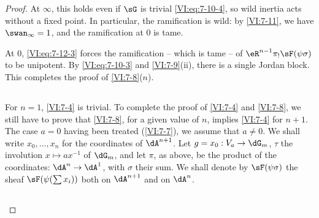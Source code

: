 \begin{proof}[Proof]
At $\infty$, this holds even if $\sG$ is trivial \eqref{VI:eq:7-10-4}, 
so wild inertia acts without a fixed point. In particular, the 
ramification is wild: by \ref{VI:7-11}, we have $\swan_\infty=1$, and the 
ramification at $0$ is tame. 

At $0$, \eqref{VI:eq:7-12-3} forces the ramification -- which is tame -- of 
$\eR^{n-1} \pi_! \sF(\psi\sigma)$ to be unipotent. By 
\eqref{VI:eq:7-10-3} and \ref{VI:7-9}(ii), there is a single Jordan block. This 
completes the proof of \ref{VI:7-8}($n$). 





\subsection{}\label{VI:7-13}

For $n=1$, \ref{VI:7-4} is trivial. To complete the proof of \ref{VI:7-4} and 
\ref{VI:7-8}, we still have to prove that \ref{VI:7-8}, for a given value 
of $n$, implies \ref{VI:7-4} for $n+1$. The case $a=0$ having been 
  treated (\ref{VI:7-7}), we assume that $a\ne 0$. We shall write $x_0,\dots,x_n$ for 
the coordinates of $\dA^{n+1}$. Let $g=x_0:V_a\to \dG_m$, $\tau$ 
the involution $x\mapsto a x^{-1}$ of $\dG_m$, and let $\pi$, as above, be the 
product of the coordinates: $\dA^n \to \dA^1$, with $\sigma$ their sum. We 
shall denote by $\sF(\psi\sigma)$ the sheaf $\sF(\psi(\sum x_i))$ both on $\dA^{n+1}$ 
and on $\dA^n$. 





\subsection{}\label{VI:7-14}


\end{proof}
